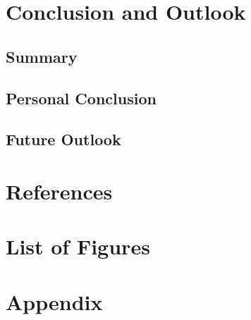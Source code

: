 \documentclass[11pt, a4paper, oneside, draft]{scrartcl}
\begin{document}
    \section{Conclusion and Outlook}

        \subsection{Summary}

        \subsection{Personal Conclusion}

        \subsection{Future Outlook}

    \section*{References}
        \printbibliography[heading=none]

    \section*{List of Figures}
        \begingroup
            \renewcommand{\listfigurename}{} %
            \listoffigures
        \endgroup

    \section*{Appendix}
\end{document}
